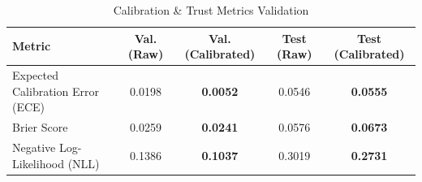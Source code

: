 \begin{table}[htbp]
\centering
\caption{Calibration \& Trust Metrics Validation}
\label{tab:trust_calibration}
\begin{tabular}{lcccc}
\toprule
Metric & Val. (Raw) & Val. (Calibrated) & Test (Raw) & Test (Calibrated) \\
\midrule
Expected Calibration Error (ECE) & 0.0198 & \textbf{0.0052} & 0.0546 & \textbf{0.0555} \\
Brier Score & 0.0259 & \textbf{0.0241} & 0.0576 & \textbf{0.0673} \\
Negative Log-Likelihood (NLL) & 0.1386 & \textbf{0.1037} & 0.3019 & \textbf{0.2731} \\
\bottomrule
\end{tabular}
\end{table}
